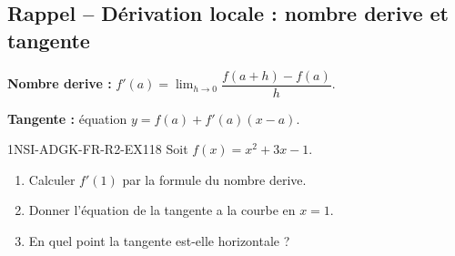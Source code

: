 

\subsection*{Rappel -- Dérivation locale : nombre derive et tangente}

\textbf{Nombre derive :} $f'(a) = \lim_{h \to 0} \dfrac{f(a+h) - f(a)}{h}$.

\textbf{Tangente :} équation $y = f(a) + f'(a)(x - a)$.

\begin{exercice}{1NSI-ADGK-FR-R2-EX1}{1}{8}
Soit $f(x) = x^2 + 3x - 1$.
\begin{enumerate}
  \item Calculer $f'(1)$ par la formule du nombre derive.
  \item Donner l'équation de la tangente a la courbe en $x = 1$.
  \item En quel point la tangente est-elle horizontale ?
\end{enumerate}
\end{exercice}


